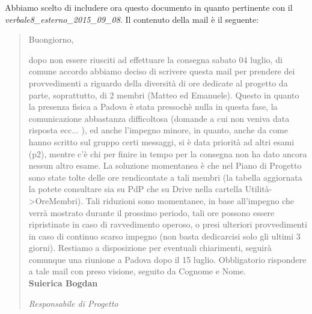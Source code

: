 Abbiamo scelto di includere ora questo documento in quanto pertinente con il \textit{verbale8\_esterno\_2015\_09\_08}. 
Il contenuto della mail è il seguente:\\

\begin{quote}
\noindent Buongiorno,
	
dopo non essere riusciti ad effettuare la consegna sabato 04 luglio, di comune accordo abbiamo deciso di scrivere questa mail per prendere dei provvedimenti a riguardo della diversità di ore dedicate al progetto da parte, soprattutto, di 2 membri (Matteo ed Emanuele). Questo in quanto la presenza fisica a Padova è stata pressochè nulla in questa fase, la comunicazione abbastanza difficoltosa (domande a cui non veniva data risposta ecc... ), ed anche l'impegno minore, in quanto, anche da come hanno scritto sul gruppo certi messaggi, si è data priorità ad altri esami (p2), mentre c'è chi per finire in tempo per la consegna non ha dato ancora nessun altro esame.
La soluzione momentanea è che nel Piano di Progetto sono state tolte delle ore rendicontate a tali membri (la tabella aggiornata la potete consultare sia su PdP che su Drive nella cartella Utilità->OreMembri). Tali riduzioni sono momentanee, in base all'impegno che verrà mostrato durante il prossimo periodo, tali ore possono essere ripristinate in caso di ravvedimento operoso, o presi ulteriori provvedimenti in caso di continuo scarso impegno (non basta dedicarcisi solo gli ultimi 3 giorni). 
Restiamo a disposizione per eventuali chiarimenti, seguirà comunque una riunione a Padova dopo il 15 luglio.
Obbligatorio rispondere a tale mail con preso visione, seguito da Cognome e Nome.\\

\noindent \textbf{Suierica Bogdan}

\noindent\textit{Responsabile di Progetto}
\end{quote}